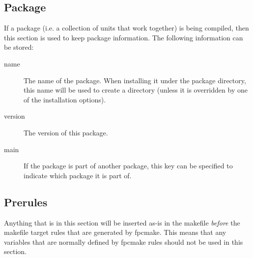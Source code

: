 \subsection{Package}
If a package (i.e. a collection of units that work together) is being 
compiled, then this section is used to keep package information. 
The following information can be stored:
\begin{description}
\item[name] The name of the package. When installing it under the package
directory, this name will be used to create a directory (unless it is
overridden by one of the installation options).
\item[version] The version of this package.
\item[main] If the package is part of another package, this key can be
specified to indicate which package it is part of.
\end{description}

\subsection{Prerules}
Anything that is in this section will be inserted as-is in the makefile
\textit{before} the makefile target rules that are generated by fpcmake.
This means that any variables that are normally defined by fpcmake rules
should not be used in this section.

